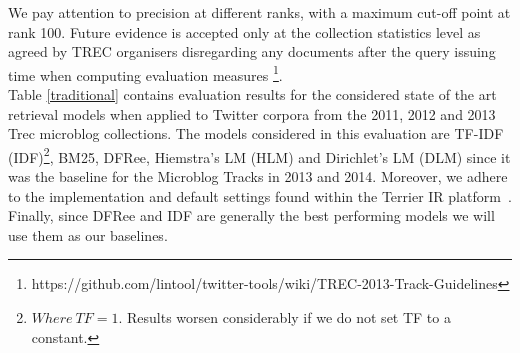 

 We pay attention to precision at different ranks, with a maximum cut-off point at rank 100. Future evidence is accepted only at the collection statistics level as agreed by TREC organisers disregarding any documents after the query issuing time when computing evaluation measures \footnote{https://github.com/lintool/twitter-tools/wiki/TREC-2013-Track-Guidelines}.\\

 Table \ref{traditional} contains evaluation results for the considered state of the art retrieval models when applied to Twitter corpora from the 2011, 2012 and 2013 Trec microblog collections. The models considered in this evaluation are TF-IDF (IDF)\footnote{\(Where~TF=1.\) Results worsen considerably if we do not set TF to a constant.}, BM25, DFRee, Hiemstra's LM (HLM) and Dirichlet's LM (DLM) since it was the baseline for the Microblog Tracks in 2013 and 2014. Moreover, we adhere to the implementation and default settings found within the Terrier IR platform~\cite{ounis2005terrier}. Finally, since DFRee and IDF are generally the best performing models we will use them as our baselines.

